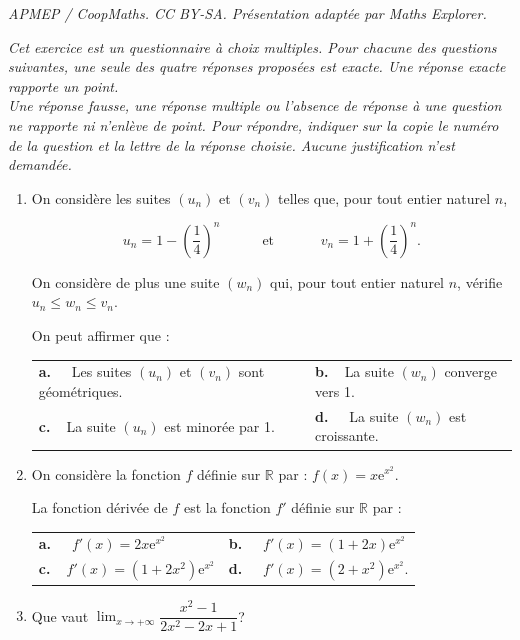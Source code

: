 \documentclass[10pt]{article}
\providecommand{\R}{\mathbb{R}}
\providecommand{\e}{{\mathrm{e}}}
\begin{document}
\noindent\textit{APMEP / CoopMaths. CC BY-SA. Présentation adaptée par Maths Explorer.}\par\medskip
\medskip

\emph{Cet exercice est un questionnaire à choix multiples. Pour chacune des questions suivantes, une seule des quatre réponses proposées est exacte. Une réponse exacte rapporte un point. \\
Une réponse fausse, une réponse multiple ou l’absence de réponse à une question ne rapporte ni n’enlève de point. Pour répondre, indiquer sur la copie le numéro de la question et la lettre de la réponse choisie. Aucune justification n’est demandée.}

\medskip

\begin{enumerate}
\item On considère les suites $\left(u_n\right)$ et $\left(v_n\right)$ telles que, pour tout entier naturel $n$,

\[u_n= 1-\left(\frac{1}{4}\right)^n \hspace{3em} \text{et }\hspace{3em} v_n=1+\left(\frac{1}{4}\right)^n.\]

On considère de plus une suite $\left(w_n\right)$ qui, pour tout entier naturel $n$, vérifie $u_n\leqslant w_n\leqslant v_n$.

On peut affirmer que :

\begin{tabularx}{\linewidth}{*{2}{X}}
\textbf{a.~~} Les suites $\left(u_n\right)$ et $\left(v_n\right)$ sont géométriques. &\textbf{b.~~}La suite $(w_n)$ converge vers 1. \\
\textbf{c.~~}La suite $\left(u_n\right)$ est minorée par 1.& \textbf{d.~~} La suite $\left(w_n\right)$ est croissante. 
\end{tabularx}

\item On considère la fonction $f$ définie sur $\R$ par : $f(x)= x\e^{x^2}$.

La fonction dérivée de $f$ est la fonction $f'$ définie sur $\R$ par :

\begin{tabularx}{\linewidth}{*{2}{X}}
\textbf{a.~~} $ f'(x) = 2x\e^{x^2}$&\textbf{b.~~} $ f'(x) = (1+2x) \e^{x^2}$\\
\textbf{c.~~}$ f'(x) = \left(1+2x^2\right) \e^{x^2}$ &\textbf{d.~~} $ f'(x) = \left(2+x^2\right) \e^{x^2} $.  
\end{tabularx}
\item Que vaut $\displaystyle \lim_{x\to +\infty} \dfrac{x^2-1}{2x^2-2x+1}$?


\end{enumerate}
\end{document}
